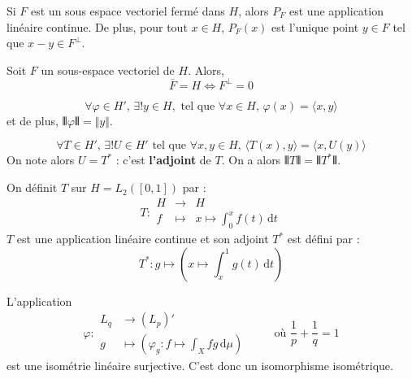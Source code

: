 	\begin{theorem}
		Si $F$ est un sous espace vectoriel fermé dans $H$, alors $P_F$ est une application linéaire continue. De plus, pour tout $x \in H$, $P_F(x)$ est l'unique point $y \in F$ tel que $x-y \in F^\perp$.
	\end{theorem}

	\begin{corollary}
		Soit $F$ un sous-espace vectoriel de $H$. Alors,
		\[ \overline{F} = H \iff F^\perp = 0 \]
	\end{corollary}

	\begin{theorem}
		\[ \forall \varphi \in H', \, \exists! y \in H, \text{ tel que } \forall x \in H, \, \varphi(x) = \langle x, y \rangle \]
		et de plus, $\VERT \varphi \VERT = \Vert y \Vert$.
	\end{theorem}

	\begin{corollary}
		\[ \forall T \in H', \, \exists! U \in H' \text{ tel que } \forall x, y \in H, \, \langle T(x), y \rangle = \langle x, U(y) \rangle \]
		On note alors $U = T^*$ : c'est \textbf{l'adjoint} de $T$. On a alors $\VERT T \VERT = \VERT T^* \VERT$.
	\end{corollary}


	\begin{example}
		On définit $T$ sur $H = L_2([0,1])$ par :
		\[
		T : \begin{array}{ccc}
			H &\rightarrow& H \\
			f &\mapsto& x \mapsto \int_{0}^{x} f(t) \, \mathrm{d}t
		\end{array}
		\]
		$T$ est une application linéaire continue et son adjoint $T^*$ est défini par :
		\[ T^* : g \mapsto \left(x \mapsto \int_x^1 g(t) \, \mathrm{d}t \right) \]
	\end{example}


	\begin{theorem}
		L'application
		\[
		\varphi :
		\begin{array}{ll}
			L_q &\rightarrow (L_p)' \\
			g &\mapsto \left( \varphi_g : f \mapsto \int_X f g \, \mathrm{d}\mu \right)
		\end{array}
		\qquad \text{ où } \frac{1}{p} + \frac{1}{q} = 1
		\]
		est une isométrie linéaire surjective. C'est donc un isomorphisme isométrique.
	\end{theorem}

